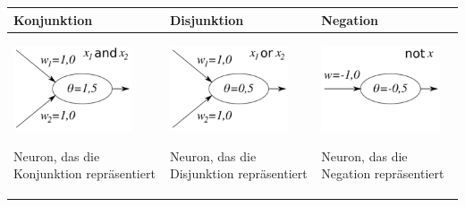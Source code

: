 \begin{tabular}{| p{4cm} | p{4cm} | p{4cm} |}
\hline \rule[-2ex]{0pt}{5.5ex} \textbf{Konjunktion} & \textbf{Disjunktion} & \textbf{Negation} \\ 
\hline \rule[-2ex]{0pt}{5.5ex}
\begin{minipage}{-1.5\textwidth}
\includegraphics[width=3.5cm]{pics/200px-Und-Neuron.png}
\label{fig:200px-Und-Neuron}
\end{minipage}


Neuron, das die Konjunktion repräsentiert
&
\begin{minipage}{-0.8\textwidth}
\centering
\includegraphics[width=3.5cm]{pics/200px-Oder-Neuron.png}
\label{fig:200px-Oder-Neuron}
\end{minipage}

Neuron, das die Disjunktion repräsentiert
&
\begin{minipage}{-0.8\textwidth}
\centering
\includegraphics[width=3.5cm]{pics/Nicht-Neuron.png}
\label{fig:Nicht-Neuron}
\end{minipage}

Neuron, das die Negation repräsentiert
\\ 
\hline 
\end{tabular} 